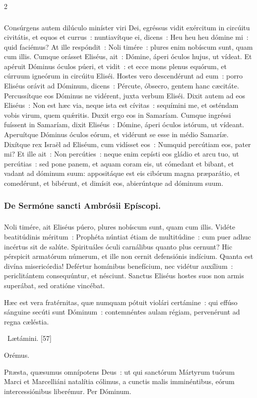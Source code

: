 \documentclass[9pt,twoside]{extarticle}
\begin{document}
\begin{multicols}{2}
{\subsubsection*{\center {}}
\lettrine{C}onsúrgens autem dilúculo miníster viri Dei, egréssus vidit exércitum in circúitu civitátis, et equos et currus~: nuntiavítque ei, dicens~: Heu heu heu dómine mi~: quid faciémus?
At ille respóndit~: Noli timére~: plures enim nobíscum sunt, quam cum illis.
Cumque orásset Eliséus, ait~: Dómine, áperi óculos hujus, ut vídeat. Et apéruit Dóminus óculos púeri, et vidit~: et ecce mons plenus equórum, et cúrruum igneórum in circúitu Eliséi.
Hostes vero descendérunt ad eum~: porro Eliséus orávit ad Dóminum, dicens~: Pércute, óbsecro, gentem hanc cæcitáte. Percussítque eos Dóminus ne vidérent, juxta verbum Eliséi.
Dixit autem ad eos Eliséus~: Non est hæc via, neque ista est cívitas~: sequímini me, et osténdam vobis virum, quem quǽritis. Duxit ergo eos in Samaríam.
Cumque ingréssi fuíssent in Samaríam, dixit Eliséus~: Dómine, áperi óculos istórum, ut vídeant. Aperuítque Dóminus óculos eórum, et vidérunt se esse in médio Samaríæ.
Dixítque rex Israël ad Eliséum, cum vidísset eos~: Numquid percútiam eos, pater mi?
Et ille ait~: Non percúties~: neque enim cepísti eos gládio et arcu tuo, ut percútias~: sed pone panem, et aquam coram eis, ut cómedant et bibant, et vadant ad dóminum suum:
appositáque est eis cibórum magna præparátio, et comedérunt, et bibérunt, et dimísit eos, abierúntque ad dóminum suum.

\subsubsection*{\center De Sermóne sancti Ambrósii Epíscopi.}
\subsubsection*{\center {}}
\lettrine{N}oli timére, ait Eliséus púero, plures nobíscum sunt, quam cum illis. Vidéte beatitúdinis méritum~: Prophéta núntiat étiam de multitúdine~: cum puer adhuc incértus sit de salúte. Spirituáles óculi carnálibus quanto plus cernunt? Hic pérspicit armatórum númerum, et ille non cernit defensiónis indícium. Quanta est divína misericórdia! Defértur homínibus benefícium, nec vidétur auxílium~: periclitántem consequúntur, et nésciunt. Sanctus Eliséus hostes suos non armis superábat, sed oratióne vincébat.

\begin{tightlist}{}
\item {} Hæc est vera fratérnitas, quæ numquam pótuit violári certámine~: qui effúso sánguine secúti sunt Dóminum~: contemnéntes aulam régiam, pervenérunt ad regna cæléstia.
\item {}~Lætámini. [57]
\item Orémus. \hfill {}
\end{tightlist}
\lettrine{P}ræsta, quæsumus omnípotens Deus~: ut qui sanctórum Mártyrum tuórum Marci et Marcelliáni natalítia cólimus, a cunctis malis imminéntibus, eórum intercessiónibus liberémur. Per Dóminum.

}
\end{multicols}
\end{document}
